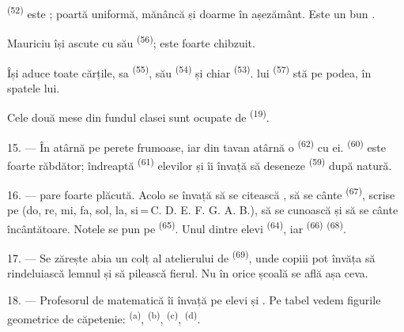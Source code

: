 \textsuperscript{(52)} este ; poartă uniformă,
mănâncă și doarme în așezământ. Este un bun .

Mauriciu își ascute  cu  său
\textsuperscript{(56)}; este foarte chibzuit.

Își aduce toate cărțile,  sa \textsuperscript{(55)},
 său \textsuperscript{(54)} și chiar 
\textsuperscript{(53)}.  lui \textsuperscript{(57)} stă pe
podea, în spatele lui.

Cele două mese din fundul clasei sunt ocupate de 
\textsuperscript{(19)}.

\VUsaut{4.6mm}
\VUsaut{3.4mm}

15. --- În  atârnă pe perete  frumoase, iar
din tavan atârnă o  \textsuperscript{(62)} cu  ei.
 \textsuperscript{(60)} este foarte răbdător; îndreaptă
 \textsuperscript{(61)} elevilor și îi învață să deseneze
 \textsuperscript{(59)} după natură.

16. ---  pare foarte plăcută. Acolo se învață să se
citească , să se cânte 
\textsuperscript{(67)}, scrise pe  (do, re, mi, fa, sol, la,
si\,=\,C. D. E. F. G. A. B.), să se cunoască  și să se cânte
 încântătoare. Notele se pun pe 
\textsuperscript{(65)}. Unul dintre elevi 
\textsuperscript{(64)}, iar  \textsuperscript{(66)}
 \textsuperscript{(68)}.

17. --- Se zărește abia un colț al atelierului de 
\textsuperscript{(69)}, unde copiii pot învăța să rindeluiască lemnul și să
pilească fierul. Nu în orice școală se află așa ceva.

\VUsaut{5.0mm}
\VUsaut{3.6mm}

18. --- Profesorul de matematică îi învață pe elevi 
 și . Pe tabel vedem
figurile geometrice de căpetenie:  \textsuperscript{(a)},
 \textsuperscript{(b)}, 
\textsuperscript{(c)},  \textsuperscript{(d)}.

